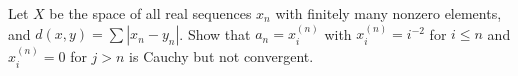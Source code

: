 Let $X$ be the space of all real sequences $x_n$ with finitely many nonzero elements, and
$d(x,y)=\sum|x_n-y_n|$. Show that $a_n=x_i^{(n)}$ with $x_i^{(n)}=i^{-2}$ for $i\leq n$ and
$x_i^{(n)}=0$ for $j>n$ is Cauchy but not convergent.\\
